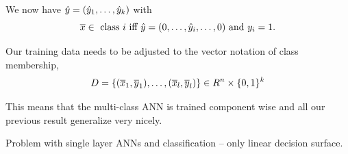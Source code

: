 \documentclass[a4paper,blends,pdf,colorBG,slideColor]{prosper}
\begin{document}
We now have $\hat{y} = (\hat{y}_1,\ldots,\hat{y}_k)$ with
\[
\overline{x} \in \mbox{ class } i \mbox{ iff } \hat{y} = (0,\ldots,\hat{y}_i,\ldots,0) \mbox{ and } y_i = 1.
\]
\es

Our training data needs to be adjusted to the vector notation of class membership,
\[
D = \{(\overline{x}_1,\overline{y}_1),\ldots,(\overline{x}_l,\overline{y}_l)\} \in R^n\times \{0,1\}^k 
\]

\vspace{.2in}
This means that the multi-class ANN is trained component wise and all our previous result generalize very nicely.
\es

%

Problem with single layer ANNs and classification -- only linear decision surface.

\vspace{.2in}

\es
\end{document}
